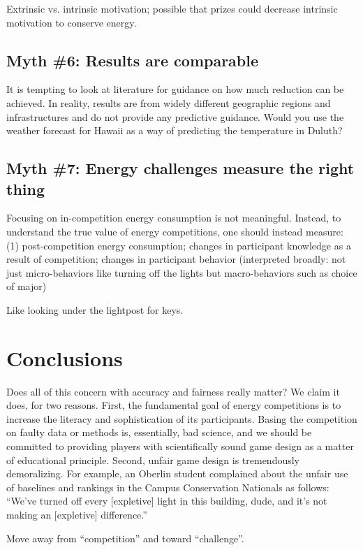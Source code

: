 \documentclass[jou]{apa} %
\begin{document}
Extrinsic vs. intrinsic motivation; possible that prizes could decrease intrinsic
motivation to conserve energy.

\subsection{Myth \#6: Results are comparable}

It is tempting to look at literature for guidance on how much reduction can be achieved.  In reality, results are from widely different geographic regions and infrastructures and do not provide any predictive guidance.  Would you use the weather forecast for Hawaii as a way of predicting the temperature in Duluth?

\subsection{Myth \#7: Energy challenges measure the right thing}

Focusing on in-competition energy consumption is not meaningful.  Instead, to understand
the true value of energy competitions, one should instead measure: (1) post-competition
energy consumption; changes in participant knowledge as a result of competition; changes
in participant behavior (interpreted broadly: not just micro-behaviors like turning off
the lights but macro-behaviors such as choice of major)

Like looking under the lightpost for keys.

\section{Conclusions}

Does all of this concern with accuracy and fairness really matter?  We claim it does, for
two reasons.  First, the fundamental goal of energy competitions is to increase the
literacy and sophistication of its participants.  Basing the competition on faulty data or
methods is, essentially, bad science, and we should be committed to providing players with
scientifically sound game design as a matter of educational principle.  Second, unfair
game design is tremendously demoralizing.  For example, an Oberlin student complained
about the unfair use of baselines and rankings in the Campus Conservation Nationals as
follows: ``We've turned off every [expletive] light in this building, dude, and it's not making
an [expletive] difference.''

Move away from ``competition'' and toward ``challenge''.
\end{document}

